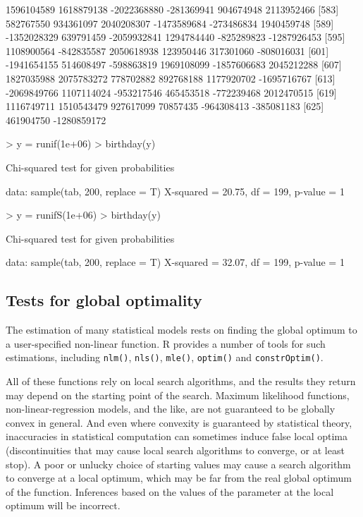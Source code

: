 \documentclass[11pt]{article}
\begin{document}
{\begin{Schunk}
\begin{Soutput}
[577]  1596104589  1618879138 -2022368880  -281369941   904674948  2113952466
[583]   582767550   934361097  2040208307 -1473589684  -273486834  1940459748
[589] -1352028329   639791459 -2059932841  1294784440  -825289823 -1287926453
[595]  1108900564  -842835587  2050618938   123950446   317301060  -808016031
[601] -1941654155   514608497  -598863819  1969108099 -1857606683  2045212288
[607]  1827035988  2075783272   778702882   892768188  1177920702 -1695716767
[613] -2069849766  1107114024  -953217546   465453518  -772239468  2012470515
[619]  1116749711  1510543479   927617099    70857435  -964308413  -385081183
[625]   461904750 -1280859172
\end{Soutput}
\begin{Sinput}
> y = runif(1e+06)
> birthday(y)
\end{Sinput}
\begin{Soutput}
	Chi-squared test for given probabilities

data:  sample(tab, 200, replace = T) 
X-squared = 20.75, df = 199, p-value = 1
\end{Soutput}
\begin{Sinput}
> y = runifS(1e+06)
> birthday(y)
\end{Sinput}
\begin{Soutput}
	Chi-squared test for given probabilities

data:  sample(tab, 200, replace = T) 
X-squared = 32.07, df = 199, p-value = 1
\end{Soutput}
\end{Schunk}
}
\subsection{Tests for global optimality}

The estimation of many statistical models rests on finding the global optimum
to a user-specified non-linear function. R provides a number of tools for such
estimations, including \texttt{nlm()}, \texttt{nls()}, \texttt{mle()}, 
\texttt{optim()}  and \texttt{constrOptim()}. 

All of these functions rely on local search algorithms, and the results they
return may depend on the starting point of the search. Maximum likelihood functions, non-linear-regression models, and the like, are not guaranteed to 
be globally convex in general. And even where convexity is guaranteed by statistical theory, inaccuracies in statistical computation can sometimes induce false local optima (discontinuities that may cause local search algorithms to converge, or at least stop).  A poor or unlucky choice of starting values may cause a search algorithm to converge at a local optimum, which may be far from the real global optimum of the function.  Inferences based on the values of the parameter at the local optimum will be incorrect. 
\end{document}
